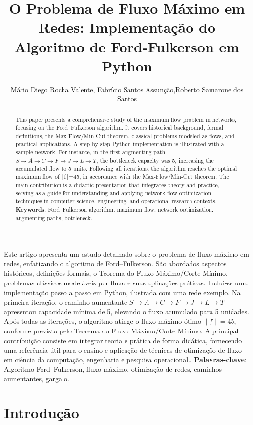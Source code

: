 \documentclass[12pt]{article}
\title{O Problema de Fluxo Máximo em Redes: Implementação do Algoritmo de Ford-Fulkerson em Python}
\author{Mário Diego Rocha Valente\inst{1}, Fabrício Santos Assunção\inst{1},Roberto Samarone dos Santos\inst{2}}
\begin{document}
 
\maketitle

\begin{abstract}
 This paper presents a comprehensive study of the maximum flow problem in networks, focusing on the Ford–Fulkerson algorithm. It covers historical background, formal definitions, the Max-Flow/Min-Cut theorem, classical problems modeled as flows, and practical applications. A step-by-step Python implementation is illustrated with a sample network. For instance, in the first augmenting path $S→A→C→F→J→L→T$, the bottleneck capacity was 5, increasing the accumulated flow to 5 units. Following all iterations, the algorithm reaches the optimal maximum flow of ∣f∣=45, in accordance with the Max-Flow/Min-Cut theorem. The main contribution is a didactic presentation that integrates theory and practice, serving as a guide for understanding and applying network flow optimization techniques in computer science, engineering, and operational research contexts.\vskip0.3cm
  \textbf{Keywords}: Ford–Fulkerson algorithm, maximum flow, network optimization, augmenting paths, bottleneck.
\end{abstract}
     
\begin{resumo} 
Este artigo apresenta um estudo detalhado sobre o problema de fluxo máximo em redes, enfatizando o algoritmo de Ford–Fulkerson. São abordados aspectos históricos, definições formais, o Teorema do Fluxo Máximo/Corte Mínimo, problemas clássicos modeláveis por fluxo e suas aplicações práticas. Inclui-se uma implementação passo a passo em Python, ilustrada com uma rede exemplo. Na primeira iteração, o caminho aumentante 
$S→A→C→F→J→L→T$ apresentou capacidade mínima de 5, elevando o fluxo acumulado para 5 unidades. Após todas as iterações, o algoritmo atinge o fluxo máximo ótimo $∣f∣=45$, conforme previsto pelo Teorema do Fluxo Máximo/Corte Mínimo. A principal contribuição consiste em integrar teoria e prática de forma didática, fornecendo uma referência útil para o ensino e aplicação de técnicas de otimização de fluxo em ciência da computação, engenharia e pesquisa operacional.. \vskip0.3cm
 \textbf{Palavras-chave}: Algoritmo Ford–Fulkerson, fluxo máximo, otimização de redes, caminhos aumentantes, gargalo.
\end{resumo}

\newpage
\section{Introdução}
\end{document}
